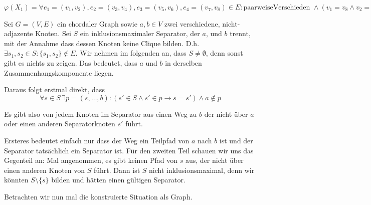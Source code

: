 

\DeclareMathOperator{\vc}{vc}





\subexercise

$\varphi(X_1) = \forall e_1 = (v_1, v_2), e_2 = (v_3, v_4), e_3 = (v_5, v_6), e_4 = (v_7, v_8) \in E \colon \text{paarweiseVerschieden } \wedge (v_1 = v_8 \wedge v_2 = v_3 \wedge v_4 = v_5 \wedge v_6 = v_7) \wedge (v_1, v_4) \notin E \wedge (v_2, v_6) \notin E \rightarrow (v_1, \dots, v_8) \cap X \neq \emptyset$


\subexercise
\label{sec:sep-clique}

Sei $G = (V,E)$ ein chordaler Graph sowie $a,b \in V$ zwei verschiedene, nicht-adjazente Knoten. Sei $S$ ein inklusionsmaximaler Separator, der $a$, und $b$ trennt, mit der Annahme dass dessen Knoten keine Clique bilden. D.h.
$\exists s_1, s_2 \in S \colon \{s_1, s_2\} \notin E$.
Wir nehmen im folgenden an, dass $S \neq \emptyset$, denn sonst gibt es nichts zu zeigen. Das bedeutet, dass $a$ und $b$ in derselben Zusammenhangskomponente liegen.

Daraus folgt erstmal direkt, dass $$\forall s \in S \, \exists p = (s, \dots, b) \colon (s' \in S \wedge s' \in p \rightarrow s = s') \wedge a \notin p$$

Es gibt also von jedem Knoten im Separator aus einen Weg zu $b$ der nicht über $a$ oder einen anderen Separatorknoten $s'$ führt.

Ersteres bedeutet einfach nur dass der Weg ein Teilpfad von $a$ nach $b$ ist und der Separator tatsächlich ein Separator ist. Für den zweiten Teil schauen wir uns das Gegenteil an:
Mal angenommen, es gibt keinen Pfad von $s$ aus, der nicht über einen anderen Knoten von $S$ führt. Dann ist $S$ nicht inklusionsmaximal, denn wir könnten $S \setminus \{s\}$ bilden und hätten einen gültigen Separator.

Betrachten wir nun mal die konstruierte Situation als Graph.

